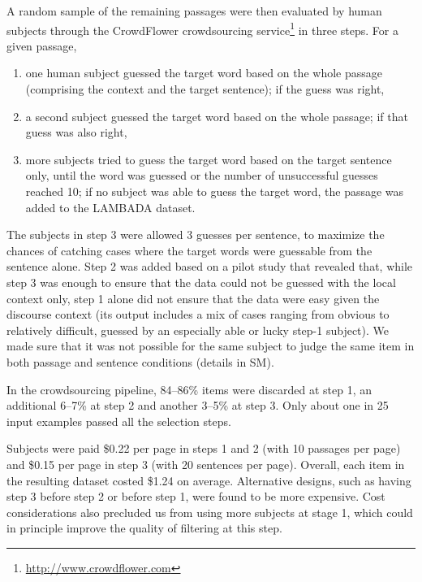 A random sample of the remaining passages were then evaluated by human subjects through the CrowdFlower crowdsourcing
service\footnote{\url{http://www.crowdflower.com}} 
 in three steps. For a given passage,

\begin{enumerate}[nolistsep]
\item one human subject guessed the target word based on the whole passage (comprising the context and the target sentence); if the guess was right, \item a second subject guessed the target word based on the whole passage; if that guess was also right, \item more subjects tried to guess the target word based on the target sentence only, until the word was guessed or the number of unsuccessful guesses reached 10; if no subject was able to guess the target word, the passage was added to the LAMBADA dataset.
\end{enumerate}

The subjects in step 3 were allowed 3 guesses per sentence, to maximize the chances of catching cases where the target words were guessable from the sentence alone. Step 2 was added based on a pilot study that revealed that, while step 3 was enough to ensure that the data could not be guessed with the local context only, step 1 alone did not ensure that the data were easy given the discourse context (its output includes a mix of cases ranging from obvious to relatively difficult, guessed by an especially able or lucky step-1 subject). We made sure that it was not possible for the same subject to judge the same item in both passage and sentence conditions (details in SM).

In the crowdsourcing pipeline,  84--86\% items were discarded at step 1, an additional 6--7\% at step 2 and another 3--5\% at step 3. Only about one in 25 input examples passed all the selection steps.

Subjects were paid \$0.22 per page in steps 1 and 2 (with 10 passages per page) and \$0.15 per page in step 3 (with 20 sentences per page). Overall, each item in the resulting dataset costed \$1.24 on average.  Alternative designs, such as having step 3 before step 2 or before step 1, were found to be more expensive. Cost considerations also precluded us from using more subjects at stage 1, which could in principle improve the quality of filtering at this step.

